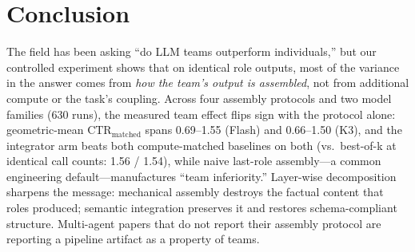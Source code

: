 \documentclass[sigconf,anonymous]{aamas}
\newcommand{\ctrm}{\mathrm{CTR}_{\text{matched}}}
\begin{document}
\section{Conclusion}
\label{sec:conclusion}

The field has been asking ``do LLM teams outperform individuals,'' but our controlled experiment shows that on identical role outputs, most of the variance in the answer comes from \emph{how the team's output is assembled}, not from additional compute or the task's coupling. Across four assembly protocols and two model families (630 runs), the measured team effect flips sign with the protocol alone: geometric-mean $\ctrm$ spans 0.69--1.55 (Flash) and 0.66--1.50 (K3), and the integrator arm beats both compute-matched baselines on both (vs.\ best-of-k at identical call counts: 1.56 / 1.54), while naive last-role assembly---a common engineering default---manufactures ``team inferiority.'' Layer-wise decomposition sharpens the message: mechanical assembly destroys the factual content that roles produced; semantic integration preserves it and restores schema-compliant structure. Multi-agent papers that do not report their assembly protocol are reporting a pipeline artifact as a property of teams.

\balance



\end{document}

